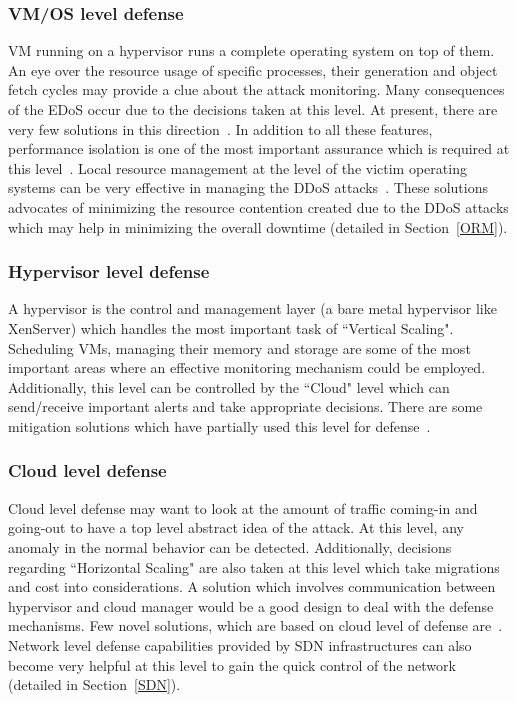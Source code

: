 \documentclass[final,5p,times,twocolumn]{elsarticle}
\begin{document}
\subsubsection{VM/OS level defense}
VM running on a hypervisor runs a complete operating system on top of them. An eye over the resource usage of specific processes, their generation and object fetch cycles may provide a clue about the attack monitoring. Many consequences of the EDoS occur due to the decisions taken at this level. At present, there are very few solutions in this direction~\cite{alqahtaniddos}. In addition to all these features, performance isolation is one of the most important assurance which is required at this level~\cite{somani2016ddos}. {Local resource management at the level of the victim operating systems can be very effective in managing the DDoS attacks~\cite{Annals}\cite{VSC}. These solutions advocates of minimizing the resource contention created due to the DDoS attacks which may help in minimizing the overall downtime (detailed in Section~\ref{ORM}). }
\subsubsection{Hypervisor level defense}
A hypervisor is the control and management layer (a bare metal hypervisor like XenServer) which handles the most important task of ``Vertical Scaling". Scheduling VMs, managing their memory and storage are some of the most important areas where an effective monitoring mechanism could be employed. Additionally, this level can be controlled by the ``Cloud" level which can send/receive important alerts and take appropriate decisions.
There are some mitigation solutions which have partially used this level for defense~\cite{alqahtaniddos}\cite{latanicki}. 
\subsubsection{Cloud level defense}
Cloud level defense may want to look at the amount of traffic coming-in and going-out to have a top level abstract idea of the attack. At this level, any anomaly in the normal behavior can be detected. Additionally, decisions regarding ``Horizontal Scaling" are also taken at this level which take migrations and cost into considerations. A solution which involves communication between hypervisor and cloud manager would be a good design to deal with the defense mechanisms. Few novel solutions, which are based on cloud level of defense are~\cite{jia2014catch}\cite{canwebeat}\cite{alqahtaniddos}\cite{latanicki}\cite{guenane2014reducing}. {Network level defense capabilities provided by SDN infrastructures can also become very helpful at this level to gain the quick control of the network (detailed in Section~\ref{SDN}).} 
\end{document}
